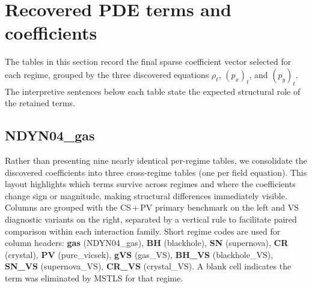 \section{Recovered PDE terms and coefficients}

The tables in this section record the final sparse coefficient vector selected
for each regime, grouped by the three discovered equations
$\rho_t$, $(p_x)_t$, and $(p_y)_t$.  The interpretive sentences below each
table state the expected structural role of the retained terms.

\subsection{NDYN04\_gas}

Rather than presenting nine nearly identical per-regime tables, we
consolidate the discovered coefficients into three cross-regime tables (one
per field equation).  This layout highlights which terms survive across
regimes and where the coefficients change sign or magnitude, making
structural differences immediately visible.  Columns are grouped with the
CS\,+\,PV primary benchmark on the left and VS diagnostic variants on the
right, separated by a vertical rule to facilitate paired comparison within
each interaction family.  Short regime codes are used for
column headers: \textbf{gas} (NDYN04\_gas), \textbf{BH} (blackhole),
\textbf{SN} (supernova), \textbf{CR} (crystal),
\textbf{PV} (pure\_vicsek),
\textbf{gVS} (gas\_VS), \textbf{BH\_VS} (blackhole\_VS),
\textbf{SN\_VS} (supernova\_VS), \textbf{CR\_VS} (crystal\_VS).
A blank cell indicates the term was eliminated by MSTLS for that regime.

